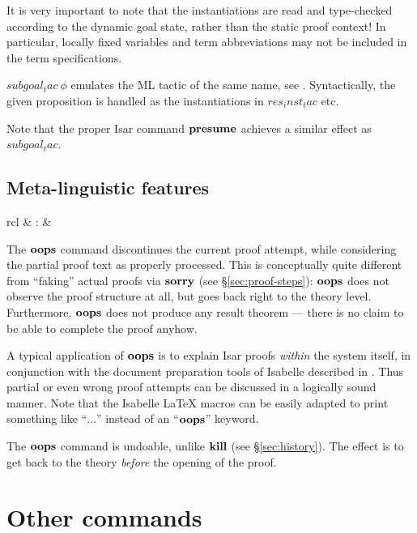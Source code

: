 \begin{descr}
  It is very important to note that the instantiations are read and
  type-checked according to the dynamic goal state, rather than the static
  proof context!  In particular, locally fixed variables and term
  abbreviations may not be included in the term specifications.
\item [$subgoal_tac~\phi$] emulates the ML tactic of the same name, see
  \cite[\S3]{isabelle-ref}.  Syntactically, the given proposition is handled
  as the instantiations in $res_inst_tac$ etc.
  
  Note that the proper Isar command ${\mathord{\mathbf{presume}}}$ achieves a similar effect
  as $subgoal_tac$.
\end{descr}


\subsection{Meta-linguistic features}

\begin{matharray}{rcl}
   & : &  \\
\end{matharray}

The ${\mathord{\mathbf{oops}}}$ command discontinues the current proof attempt, while considering
the partial proof text as properly processed.  This is conceptually quite
different from ``faking'' actual proofs via ${\mathord{\mathbf{sorry}}}$ (see
\S\ref{sec:proof-steps}): ${\mathord{\mathbf{oops}}}$ does not observe the proof structure at all,
but goes back right to the theory level.  Furthermore, ${\mathord{\mathbf{oops}}}$ does not
produce any result theorem --- there is no claim to be able to complete the
proof anyhow.

A typical application of ${\mathord{\mathbf{oops}}}$ is to explain Isar proofs \emph{within} the
system itself, in conjunction with the document preparation tools of Isabelle
described in \cite{isabelle-sys}.  Thus partial or even wrong proof attempts
can be discussed in a logically sound manner.  Note that the Isabelle {\LaTeX}
macros can be easily adapted to print something like ``$\dots$'' instead of an
``${\mathord{\mathbf{oops}}}$'' keyword.

\medskip The ${\mathord{\mathbf{oops}}}$ command is undoable, unlike ${\mathord{\mathbf{kill}}}$ (see
\S\ref{sec:history}).  The effect is to get back to the theory \emph{before}
the opening of the proof.


\section{Other commands}

